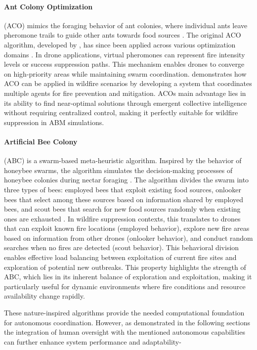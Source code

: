 \documentclass[twoside]{article}
\begin{document}
\paragraph{Ant Colony Optimization} (ACO) mimics the foraging behavior of ant colonies, where individual ants leave pheromone trails to guide other ants towards food sources \citep{ACO}. The original ACO algorithm, developed by \citet*{ACO}, has since been applied across various optimization domains \citep{ACO_recent_advances}.
In drone applications, virtual pheromones can represent fire intensity levels or success suppression paths. This mechanism enables drones to converge on high-priority areas while maintaining swarm coordination.
\citet*{HybridAntColonyWildfire} demonstrates how ACO can be applied in wildfire scenarios by developing a system that coordinates multiple agents for fire prevention and mitigation. ACOs main advantage lies in its ability to find near-optimal solutions through emergent collective intelligence without requiring centralized control, making it perfectly suitable for wildfire suppression in ABM simulations.


\paragraph{Artificial Bee Colony} (ABC) is a swarm-based meta-heuristic algorithm. Inspired by the behavior of honeybee swarms, the algorithm simulates the decision-making processes of honeybee colonies during nectar foraging \citep{karaboga2007abc}. The algorithm divides the swarm into three types of bees: employed bees that exploit existing food sources, onlooker bees that select among these sources based on information shared by employed bees, and scout bees that search for new food sources randomly when existing ones are exhausted \citep{karaboga2007abc}.
In wildfire suppression contexts, this translates to drones that can exploit known fire locations (employed behavior), explore new fire areas based on information from other drones (onlooker behavior), and conduct random searches when no fires are detected (scout behavior). This behavioral division enables effective load balancing between exploitation of current fire sites and exploration of potential new outbreaks. This property highlights the strength of ABC, which lies in its inherent balance of exploration and exploitation, making it particularly useful for dynamic environments where fire conditions and resource availability change rapidly.

These nature-inspired algorithms provide the needed computational foundation for autonomous coordination. However, as demonstrated in the following sections the integration of human oversight with the mentioned autonomous capabilities can further enhance system performance and adaptability-
\end{document}
